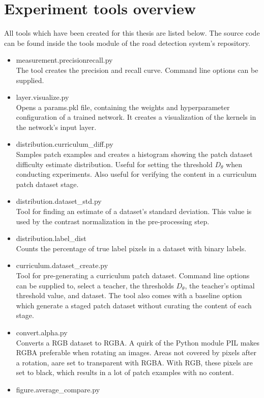 \section{Experiment tools overview}
\label{app:tools}
All tools which have been created for this thesis are listed below. The source code can be found inside the tools module of the road detection system's repository.
\begin{itemize}
\item measurement.precisionrecall.py\\
The tool creates the precision and recall curve. Command line options can be supplied.
\item layer.visualize.py\\
Opens a params.pkl file, containing the weights and hyperparameter configuration of a trained network. It creates a visualization of the kernels in the network's input layer.
\item distribution.curriculum\_diff.py\\
Samples patch examples and creates a histogram showing the patch dataset difficulty estimate distribution. Useful for setting the  threshold $D_\theta$ when conducting experiments. Also useful for verifying the content in a curriculum patch dataset stage.
\item distribution.dataset\_std.py\\
Tool for finding an estimate of a dataset's standard deviation. This value is used by the contrast normalization in the pre-processing step.
\item distribution.label\_dist\\
Counts the percentage of true label pixels in a dataset with binary labels.
\item curriculum.dataset\_create.py\\
Tool for pre-generating a curriculum patch dataset. Command line options can be supplied to, select a teacher, the thresholds $D_\theta$, the teacher's optimal threshold value, and dataset. The tool also comes with a baseline option which generate a staged patch dataset without curating the content of each stage.
\item convert.alpha.py\\
Converts a RGB dataset to RGBA. A quirk of the Python module PIL makes RGBA preferable when rotating an images. Areas not covered by pixels after a rotation, aare set to transparent with RGBA. With RGB, these pixels are set to black, which results in a lot of patch examples with no content.
\item figure.average\_compare.py\\

\end{itemize}
